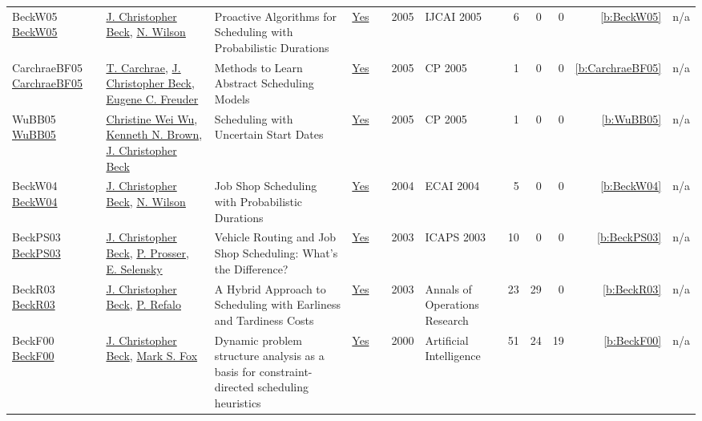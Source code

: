 {\begin{longtable}{>{\raggedright\arraybackslash}p{3cm}>{\raggedright\arraybackslash}p{6cm}>{\raggedright\arraybackslash}p{6.5cm}rrrp{2.5cm}rrrrr}
BeckW05 \href{http://ijcai.org/Proceedings/05/Papers/0748.pdf}{BeckW05} & \hyperref[auth:a89]{J. Christopher Beck}, \hyperref[auth:a832]{N. Wilson} & Proactive Algorithms for Scheduling with Probabilistic Durations & \href{../works/BeckW05.pdf}{Yes} & \cite{BeckW05} & 2005 & IJCAI 2005 & 6 & 0 & 0 & \ref{b:BeckW05} & n/a\\
CarchraeBF05 \href{https://doi.org/10.1007/11564751_80}{CarchraeBF05} & \hyperref[auth:a274]{T. Carchrae}, \hyperref[auth:a89]{J. Christopher Beck}, \hyperref[auth:a275]{Eugene C. Freuder} & Methods to Learn Abstract Scheduling Models & \href{../works/CarchraeBF05.pdf}{Yes} & \cite{CarchraeBF05} & 2005 & CP 2005 & 1 & 0 & 0 & \ref{b:CarchraeBF05} & n/a\\
WuBB05 \href{https://doi.org/10.1007/11564751_110}{WuBB05} & \hyperref[auth:a276]{Christine Wei Wu}, \hyperref[auth:a222]{Kenneth N. Brown}, \hyperref[auth:a89]{J. Christopher Beck} & Scheduling with Uncertain Start Dates & \href{../works/WuBB05.pdf}{Yes} & \cite{WuBB05} & 2005 & CP 2005 & 1 & 0 & 0 & \ref{b:WuBB05} & n/a\\
BeckW04 \href{}{BeckW04} & \hyperref[auth:a89]{J. Christopher Beck}, \hyperref[auth:a832]{N. Wilson} & Job Shop Scheduling with Probabilistic Durations & \href{../works/BeckW04.pdf}{Yes} & \cite{BeckW04} & 2004 & ECAI 2004 & 5 & 0 & 0 & \ref{b:BeckW04} & n/a\\
BeckPS03 \href{http://www.aaai.org/Library/ICAPS/2003/icaps03-027.php}{BeckPS03} & \hyperref[auth:a89]{J. Christopher Beck}, \hyperref[auth:a833]{P. Prosser}, \hyperref[auth:a834]{E. Selensky} & Vehicle Routing and Job Shop Scheduling: What's the Difference? & \href{../works/BeckPS03.pdf}{Yes} & \cite{BeckPS03} & 2003 & ICAPS 2003 & 10 & 0 & 0 & \ref{b:BeckPS03} & n/a\\
BeckR03 \href{https://doi.org/10.1023/A:1021849405707}{BeckR03} & \hyperref[auth:a89]{J. Christopher Beck}, \hyperref[auth:a256]{P. Refalo} & A Hybrid Approach to Scheduling with Earliness and Tardiness Costs & \href{../works/BeckR03.pdf}{Yes} & \cite{BeckR03} & 2003 & Annals of Operations Research & 23 & 29 & 0 & \ref{b:BeckR03} & n/a\\
BeckF00 \href{https://doi.org/10.1016/S0004-3702(99)00099-5}{BeckF00} & \hyperref[auth:a89]{J. Christopher Beck}, \hyperref[auth:a304]{Mark S. Fox} & Dynamic problem structure analysis as a basis for constraint-directed scheduling heuristics & \href{../works/BeckF00.pdf}{Yes} & \cite{BeckF00} & 2000 & Artificial Intelligence & 51 & 24 & 19 & \ref{b:BeckF00} & n/a\\

\end{longtable}}
